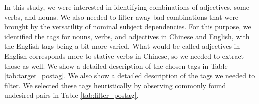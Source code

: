 \documentclass[smallextended,natbib]{svjour3}       %
\begin{document}
    In this study, we were interested in identifying combinations of adjectives, some verbs, and nouns. We also needed to filter away bad combinations that were brought by the versatility of nominal subject dependencies. For this purpose, we identified the tags for nouns, verbs, and adjectives in Chinese and English, with the English tags being a bit more varied. What would be called adjectives in English corresponds more to stative verbs in Chinese, so we needed to extract those as well. We show a detailed description of the chosen tags in Table \ref{tab:target_postag}. We also show a detailed description of the tags we needed to filter. We selected these tags heuristically by observing commonly found undesired pairs in Table \ref{tab:filter_postag}.

\end{document}
